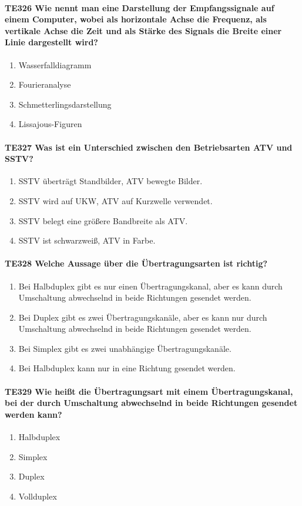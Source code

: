\documentclass[8pt]{article}
\begin{document}
\begin{enumerate}
\paragraph*{TE326 Wie nennt man eine Darstellung der Empfangssignale auf einem Computer, wobei als horizontale Achse die Frequenz, als vertikale Achse die Zeit und als Stärke des Signals die Breite einer Linie dargestellt wird?}
\begin{enumerate}[nolistsep,label=\Alph*]
\item Wasserfalldiagramm
\item Fourieranalyse
\item Schmetterlingsdarstellung
\item Lissajous-Figuren
\end{enumerate}

\paragraph*{TE327 Was ist ein Unterschied zwischen den Betriebsarten ATV und SSTV?}
\begin{enumerate}[nolistsep,label=\Alph*]
\item SSTV überträgt Standbilder, ATV bewegte Bilder.
\item SSTV wird auf UKW, ATV auf Kurzwelle verwendet.
\item SSTV belegt eine größere Bandbreite als ATV.
\item SSTV ist schwarzweiß, ATV in Farbe.
\end{enumerate}

\paragraph*{TE328 Welche Aussage über die Übertragungsarten ist richtig?}
\begin{enumerate}[nolistsep,label=\Alph*]
\item Bei Halbduplex gibt es nur einen Übertragungskanal, aber es kann durch Umschaltung abwechselnd in beide Richtungen gesendet werden.
\item Bei Duplex gibt es zwei Übertragungskanäle, aber es kann nur durch Umschaltung abwechselnd in beide Richtungen gesendet werden.
\item Bei Simplex gibt es zwei unabhängige Übertragungskanäle. 
\item Bei Halbduplex kann nur in eine Richtung gesendet werden.
\end{enumerate}

\paragraph*{TE329 Wie heißt die Übertragungsart mit einem Übertragungskanal, bei der durch Umschaltung abwechselnd in beide Richtungen gesendet werden kann?}
\begin{enumerate}[nolistsep,label=\Alph*]
\item Halbduplex
\item Simplex
\item Duplex
\item Vollduplex
\end{enumerate}


\end{enumerate}
\end{document}
